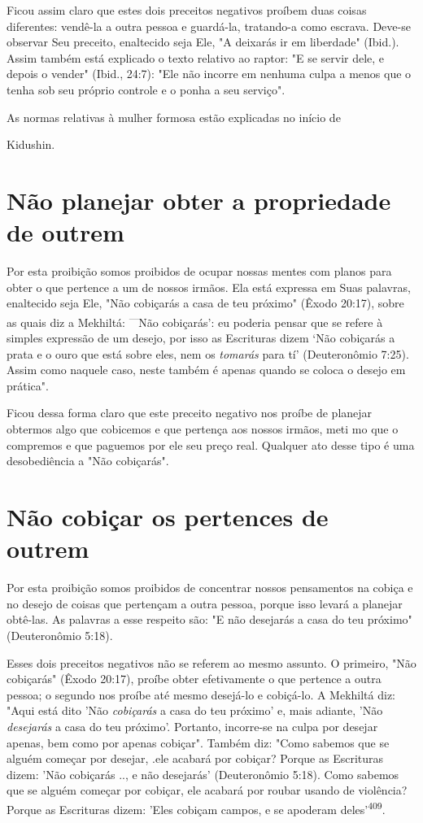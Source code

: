 \begin{itemize}
\begin{enumrate}
\begin{itemize}
\begin{itemize}
\begin{itemize}
Ficou assim claro que estes dois preceitos negativos proíbem duas coisas
diferentes: vendê-la a outra pessoa e guardá-la, tratando-a como
escrava. Deve-se observar Seu preceito, enaltecido seja Ele, "A deixarás
ir em liberda­de" (Ibid.). Assim também está explicado o texto relativo
ao raptor: "E se ser­vir dele, e depois o vender" (Ibid., 24:7): "Ele
não incorre em nenhuma culpa a menos que o tenha sob seu próprio
controle e o ponha a seu serviço".


As normas relativas à mulher formosa estão explicadas no início de


Kidushin.

\section{Não planejar obter a propriedade de outrem}

Por esta proibição somos proibidos de ocupar nossas mentes com planos
para obter o que pertence a um de nossos irmãos. Ela está expressa em
Suas palavras, enaltecido seja Ele, "Não cobiçarás a casa de teu
próximo" (Êxo­do 20:17), sobre as quais diz a Mekhiltá:
\textsuperscript{---}Não cobiçarás': eu poderia pensar que se refere à
simples expressão de um desejo, por isso as Escrituras dizem `Não
cobiçarás a prata e o ouro que está sobre eles, nem os \emph{tomarás}
para tí' (Deuteronômio 7:25). Assim como naquele caso, neste também é
apenas quan­do se coloca o desejo em prática".

Ficou dessa forma claro que este preceito negativo nos proíbe de
planejar obtermos algo que cobicemos e que pertença aos nossos irmãos,
meti mo que o compremos e que paguemos por ele seu preço real. Qualquer
ato desse tipo é uma desobediência a "Não cobiçarás".

\section{Não cobiçar os pertences de outrem}

Por esta proibição somos proibidos de concentrar nossos pensamen­tos na
cobiça e no desejo de coisas que pertençam a outra pessoa, porque isso
levará a planejar obtê-las. As palavras a esse respeito são: "E não
desejarás a casa do teu próximo" (Deuteronômio 5:18).

Esses dois preceitos negativos não se referem ao mesmo assunto. O
primeiro, "Não cobiçarás" (Êxodo 20:17), proíbe obter efetivamente o que
per­tence a outra pessoa; o segundo nos proíbe até mesmo desejá-lo e
cobiçá-lo. A Mekhiltá diz: "Aqui está dito 'Não \emph{cobiçarás} a casa
do teu próximo' e, mais adiante, 'Não \emph{desejarás} a casa do teu
próximo'. Portanto, incorre-se na culpa por desejar apenas, bem como por
apenas cobiçar". Também diz: "Como sa­bemos que se alguém começar por
desejar, .ele acabará por cobiçar? Porque as Escrituras dizem: 'Não
cobiçarás .., e não desejarás' (Deuteronômio 5:18). Como sabemos que se
alguém começar por cobiçar, ele acabará por roubar usan­do de violência?
Porque as Escrituras dizem: 'Eles cobiçam campos, e se apo­deram
deles'\textsuperscript{409}.


\end{itemize}
\end{itemize}
\end{itemize}
\end{enumrate}
\end{itemize}
